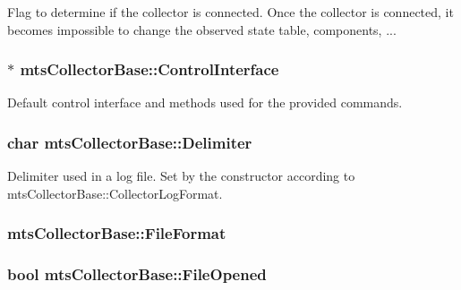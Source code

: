Flag to determine if the collector is connected. Once the collector is connected, it becomes impossible to change the observed state table, components, ... \hypertarget{classmts_collector_base_abfd24852cb33dc25956b49ed2896ac10}{
\subsubsection[{Control\-Interface}]{$\ast$ mts\-Collector\-Base\-::\-Control\-Interface\hspace{0.3cm}{\ttfamily [protected]}}}\label{classmts_collector_base_abfd24852cb33dc25956b49ed2896ac10}
Default control interface and methods used for the provided commands. \hypertarget{classmts_collector_base_a7d711ebe23e8573509789daa9e7392e6}{
\subsubsection[{Delimiter}]{\setlength{\rightskip}{0pt plus 5cm}char mts\-Collector\-Base\-::\-Delimiter\hspace{0.3cm}{\ttfamily [protected]}}}\label{classmts_collector_base_a7d711ebe23e8573509789daa9e7392e6}
Delimiter used in a log file. Set by the constructor according to mts\-Collector\-Base\-::\-Collector\-Log\-Format. \hypertarget{classmts_collector_base_a5afbc705a454a6e1394ff4bfd1c17774}{
\subsubsection[{File\-Format}]{ mts\-Collector\-Base\-::\-File\-Format\hspace{0.3cm}{\ttfamily [protected]}}}\label{classmts_collector_base_a5afbc705a454a6e1394ff4bfd1c17774}
\hypertarget{classmts_collector_base_a051e5495fad8d0ade499d031e8d9ffbc}{
\subsubsection[{File\-Opened}]{\setlength{\rightskip}{0pt plus 5cm}bool mts\-Collector\-Base\-::\-File\-Opened\hspace{0.3cm}{\ttfamily [protected]}}}\label{classmts_collector_base_a051e5495fad8d0ade499d031e8d9ffbc}
